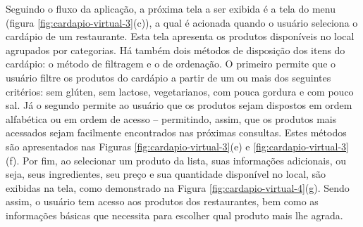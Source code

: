 Seguindo o fluxo da aplicação, a próxima tela a ser exibida é a tela do menu (figura \ref{fig:cardapio-virtual-3}(c)), a qual é acionada quando o usuário seleciona o cardápio de um restaurante. Esta tela apresenta os produtos disponíveis no local agrupados por categorias. Há também dois métodos de disposição dos itens do cardápio: o método de filtragem e o de ordenação. O primeiro permite que o usuário filtre os produtos do cardápio a partir de um ou mais dos seguintes critérios: sem glúten, sem lactose, vegetarianos, com pouca gordura e com pouco sal. Já o segundo permite ao usuário que os produtos sejam dispostos em ordem alfabética ou em ordem de acesso -- permitindo, assim, que os produtos mais acessados sejam facilmente encontrados nas próximas consultas. Estes métodos são apresentados nas Figuras \ref{fig:cardapio-virtual-3}(e) e \ref{fig:cardapio-virtual-3}(f). Por fim, ao selecionar um produto da lista, suas informações adicionais, ou seja, seus ingredientes, seu preço e sua quantidade disponível no local, são exibidas na tela, como demonstrado na Figura \ref{fig:cardapio-virtual-4}(g). Sendo assim, o usuário tem acesso aos produtos dos restaurantes, bem como as informações básicas que necessita para escolher qual produto mais lhe agrada.

